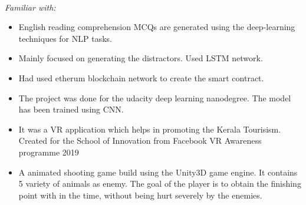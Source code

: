 \\


\textit{Familiar with: } 
\\


\begin{itemize}
\item\justify English reading comprehension MCQs are generated using the deep-learning techniques
for NLP tasks.
\item\justify Mainly focused on generating the distractors. Used LSTM network.
\end{itemize}
\smallskip

\begin{itemize}
\item\justify Had used etherum blockchain network to create the smart contract.
\end{itemize}
\smallskip

\begin{itemize}
\item\justify The project was done for the udacity deep learning nanodegree. The model has been
trained using CNN.
\end{itemize}
\smallskip

\begin{itemize}
\item\justify It was a VR application which helps in promoting the Kerala Tourisism. Created for
the School of Innovation from Facebook VR Awareness programme 2019
\end{itemize}
\smallskip

\begin{itemize}
\item\justify A animated shooting game build using the Unity3D game engine. It contains 5 variety
of animals as enemy. The goal of the player is to obtain the finishing point with in the
time, without being hurt severely by the enemies.
\end{itemize}
\smallskip

